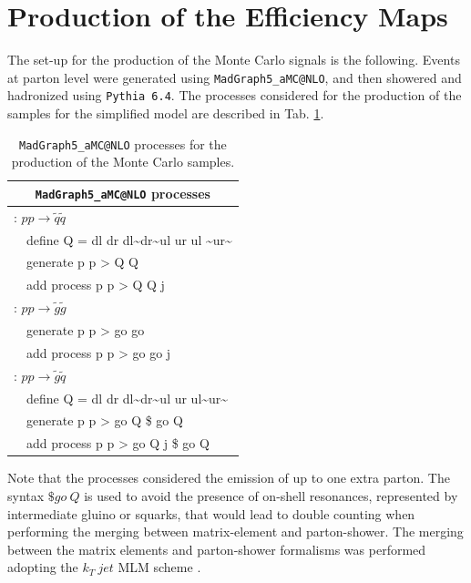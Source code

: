 \documentclass[epj,nopacs,fleqn]{svjour}
\begin{document}
\section{Production of the Efficiency Maps}\label{EMprod}
The set-up for the production of the Monte Carlo signals is the following. Events at parton level were generated using \texttt{MadGraph5\_aMC@NLO}\cite{Alwall:2011uj}, and then showered and hadronized using \texttt{Pythia 6.4}\cite{Sjostrand:2006za}. The processes considered for the production of the samples for the simplified model are described in Tab. \ref{mg5_processes}.
\begin{table}[b]
	\begin{center}
		\renewcommand{\arraystretch}{1.3}
		\begin{tabular}{ l l }  \toprule  \toprule 
			\multicolumn{2}{c}{\texttt{MadGraph5\_aMC@NLO} processes} \\ \toprule \toprule
			\multicolumn{2}{l}{\Ttwo: $p p \rightarrow \tilde q \tilde q$}  \\
			& define Q = dl dr dl\textasciitilde dr\textasciitilde ul ur ul \textasciitilde ur\textasciitilde \\
			& generate p p > Q Q  \\
			&  add process p p > Q Q j \\  \toprule 
			\multicolumn{2}{l}{\Tfive: $p p \rightarrow \tilde g \tilde g$ } \\ 
			& generate p p > go go \\
			&  add process p p > go go j \\ \toprule 
			\multicolumn{2}{l}{\TGQ: $p p \rightarrow \tilde g \tilde q$} \\  
			&  define Q = dl dr dl\textasciitilde dr\textasciitilde ul ur ul\textasciitilde ur\textasciitilde \\
			&  generate p p > go Q \$ go Q \\
			&  add process p p > go Q j \$ go Q \\  \bottomrule \bottomrule 
		\end{tabular}
	\end{center}
	\caption{\texttt{MadGraph5\_aMC@NLO} processes for the production of the Monte Carlo samples.}
	\label{mg5_processes}
\end{table}
 Note that the processes considered the emission of up to one extra parton. The syntax $\$go \ Q$ is used to avoid the presence of on-shell resonances, represented by intermediate gluino or squarks, that would lead to double counting when performing the merging between matrix-element and parton-shower. The merging between the matrix elements and parton-shower formalisms was performed adopting the $k_T \ jet$ MLM scheme \cite{MLM,Alwall:2007fs}. 
\end{document}
